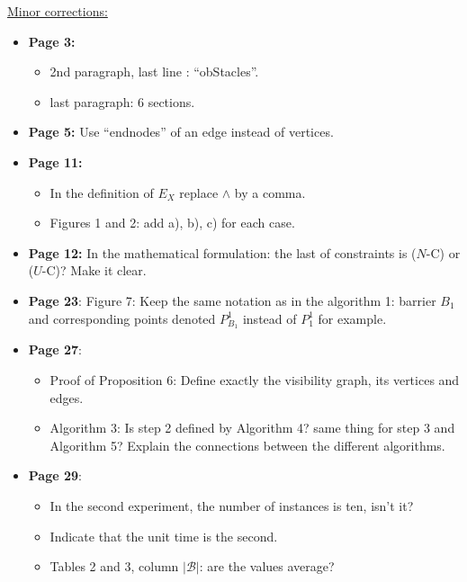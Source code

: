 \documentclass{article}
\newenvironment{reviewer}{\setcounter{pointcounter}{1}}{}
\begin{document}
\begin{reviewer}
		
		\begin{itshape}
			\underline{Minor corrections:}
			\begin{itemize}
				\item \textbf{Page 3:} 
				\begin{itemize}
					\item 2nd paragraph, last line : ``obStacles''.
					\item last paragraph: 6 sections.
				\end{itemize}
				\item \textbf{Page 5:} Use ``endnodes'' of an edge instead of vertices.
				\item \textbf{Page 11:} 
				\begin{itemize} 
					\item In the definition of $E_X$ replace $\wedge$ by a comma.
					\item Figures 1 and 2: add a), b), c) for each case.
				\end{itemize}
				\item \textbf{Page 12:} In the mathematical formulation: the last of constraints is ($N$-C) or ($U$-C)? Make it clear.
				\item \textbf{Page 23}: Figure 7: Keep the same notation as in the algorithm 1: barrier $B_1$ and corresponding points denoted $P^1_{B_1}$ instead of $P^1_1$ for example. 
				\item \textbf{Page 27}: 
				\begin{itemize}
					\item Proof of Proposition 6: Define exactly the visibility graph, its vertices and edges.
					\item Algorithm 3: Is step 2 defined by Algorithm 4? same thing for step 3 and Algorithm 5? Explain the connections between the different algorithms.
				\end{itemize}
				\item \textbf{Page 29}:
				\begin{itemize}
					\item In the second experiment, the number of instances is ten, isn’t it?
					\item Indicate that the unit time is the second.
					\item Tables 2 and 3, column $|\mathcal B|$: are the values average?
				\end{itemize}
			\end{itemize}
			
		\end{itshape}


\end{reviewer}
\end{document}
